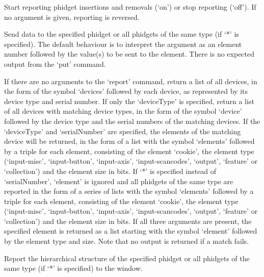   Start reporting phidget insertions and removals (`on') or stop reporting (`off').
  If no argument is given, reporting is reversed. 

  Send data to the specified phidget or all phidgets of the same type (if `*' is specified).
  The default behaviour is to interpret the argument as an element number followed by the value(s) to be sent
  to the element.
  There is no expected output from the `put' command.

  If there are no arguments to the `report' command, return a list of all devices, in the form of the symbol `devices'
  followed by each device, as represented by its device type and serial number.
  If only the `deviceType' is specified, return a list of all devices with matching device types, in the form of the
  symbol `device' followed by the device type and the serial numbers of the matching devices.
  If the `deviceType' and `serialNumber' are specified, the elements of the matching device will be returned,
  in the form of a list with the symbol `elements' followed by a triple for each element,
  consisting of the element `cookie', the element type
  (`input-misc', `input-button', `input-axis', `input-scancodes', `output', `feature' or `collection') and the
  element size in bits.
  If `*' is specified instead of `serialNumber', `element' is ignored and all phidgets of the same type are reported in the
  form of a series of lists with the symbol `elements' followed by a triple for each element,
  consisting of the element `cookie', the element type
  (`input-misc', `input-button', `input-axis', `input-scancodes', `output', `feature' or `collection') and the
  element size in bits.
  If all three arguments are present, the specified element is returned as a list starting with the symbol
  `element' followed by the element type and size.
  Note that no output is returned if a match fails.

  Report the hierarchical structure of the specified phidget or all phidgets of the same type (if `*' is specified)
  to the \MaxName{} window.

  \objListCmdEnd

\objItemFile

\objItemMessage


